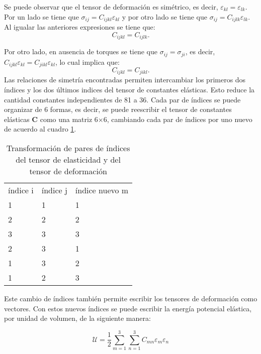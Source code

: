 \documentclass[12pt]{article}
\begin{document}
Se puede observar que el tensor de deformación es simétrico, es decir, $\varepsilon_{kl} = \varepsilon_{lk}$. Por un lado se tiene que $\sigma_{ij} = C_{ijkl}\varepsilon_{kl}$ y por otro lado se tiene que $\sigma_{ij} = C_{ijlk}\varepsilon_{lk}$. Al igualar las anteriores expresiones se tiene que:
\begin{equation}
	C_{ijkl} = C_{ijlk}.
\end{equation}

Por otro lado, en ausencia de torques se tiene que $\sigma_{ij} = \sigma_{ji}$, es decir, $C_{ijkl}\varepsilon_{kl} = C_{jikl}\varepsilon_{kl}$, lo cual implica que: 
\begin{equation}
	C_{ijkl} = C_{jikl}.
\end{equation}
Las relaciones de simetría encontradas permiten intercambiar los primeros dos índices y los dos últimos indices del tensor de constantes elásticas. Esto reduce la cantidad constantes independientes de 81 a 36. Cada par de índices se puede organizar de 6 formas, es decir, se puede reescribir el tensor de constantes elásticas $\bm{C}$ como una matriz 6$\times$6, cambiando cada par de índices por uno nuevo de acuerdo al cuadro \ref{tab:my-table}.

\begin{table}[H]
	\centering
	\begin{tabular}{lll}
	índice i & índice j & índice nuevo m \\
	1 & 1 & 1            \\
	2 & 2 & 2            \\
	3 & 3 & 3            \\
	2 & 3 & 1            \\
	1 & 3 & 2            \\
	1 & 2 & 3           
	\end{tabular}
	\caption{Transformación de pares de índices del tensor de elasticidad y del tensor de deformación}
	\label{tab:my-table}
\end{table}

Este cambio de índices también permite escribir los tensores de deformación como vectores. Con estos nuevos índices se puede escribir la energía potencial elástica, por unidad de volumen, de la siguiente manera: 

\begin{equation}
	\mathcal{U} = \frac{1}{2} \sum_{m=1}^{3}{\sum_{n=1}^{3}{C_{mn}\varepsilon_{m}\varepsilon_{n}}}
	\label{eq:u_vol}
\end{equation}
\end{document}
